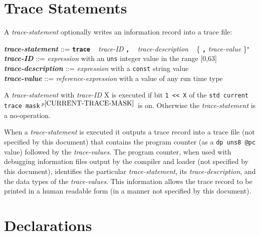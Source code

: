 \documentclass[12pt]{article}
\newcommand{\TT}[1]{{\tt \bfseries #1}}
\newcommand{\STAR}{{\Large $^\star$}}
\newcommand{\ttkey}[1]{{\tt \bfseries #1}}
\newcommand{\emkey}[1]{{\em \bfseries #1}}
\newcommand{\pagnote}[1]{$\,^{p\pageref{#1}}$}
\newenvironment{indpar}[1][0.3in]%
	{\begin{list}{}%
		     {\setlength{\itemsep}{0in}%
		      \setlength{\topsep}{0in}%
		      \setlength{\parsep}{1ex}%
		      \setlength{\labelwidth}{#1}%
		      \setlength{\leftmargin}{#1}%
		      \addtolength{\leftmargin}{\labelsep}}%
	 \item}%
	{\end{list}}
\begin{document}
\section{Trace Statements}
\label{TRACE-STATEMENTS}

A {\em trace-statement} optionally writes an information record into
a trace file:
\begin{indpar}
\emkey{trace-statement}\label{TRACE-STATEMENT} ::=
    \ttkey{trace} ~ {\em trace-ID} \TT{,} ~ {\em trace-description}
        ~ \{ \TT{,} {\em trace-value} \}\STAR \\
\emkey{trace-ID} ::=
    {\em expression} with an {\tt uns} integer value in the range [0,63] \\
\emkey{trace-description} ::=
    {\em expression} with a {\tt const} string value \\
\emkey{trace-value} ::=
    {\em reference-expression} with a value of any run time type
\end{indpar}

A {\em trace-statement} with {\em trace-ID} X is executed if bit
{\tt 1 <{}< X} of the {\tt std current trace mask}\pagnote{CURRENT-TRACE-MASK}
is on.  Otherwise the {\em trace-statement} is a no-operation.

When a {\em trace-statement} is executed it outputs a trace record into
a trace file (not specified by this document) that contains the program
counter (as a {\tt dp uns8 @pc} value) followed by the {\em trace-values}.
The program counter, when used with debugging information
files output by the compiler and loader (not specified by this document),
identifies the particular {\em trace-statement}, its
{\em trace-description}, and the data types of the {\em trace-values}.
This information allows the trace record to
be printed in a human readable form (in a manner not specified by this
document).


\section{Declarations}
\label{DECLARATIONS}
\end{document}
